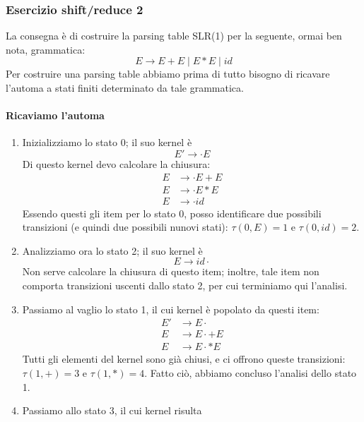 \documentclass[class=book, crop=false, oneside, 12pt]{standalone}
\begin{document}
\subsubsection{Esercizio shift/reduce 2}
La consegna è di costruire la parsing table SLR(1) per la seguente, ormai ben nota, grammatica:
\begin{equation}
    \label{eq:ex2-sh/re-grammar}
    E \to E+E \mid E*E \mid id
\end{equation} 
Per costruire una parsing table abbiamo prima di tutto bisogno di ricavare l'automa a stati finiti determinato da tale grammatica.
\paragraph{Ricaviamo l'automa}
\begin{enumerate}
    \item Inizializziamo lo stato 0; il suo kernel è 
    \begin{equation*}
        E' \to \cdot E
    \end{equation*}
    Di questo kernel devo calcolare la chiusura:
    \begin{align*}
        E &\to \cdot E+E \\
        E &\to \cdot E*E \\
        E &\to \cdot id
    \end{align*}
    Essendo questi gli item per lo stato 0, posso identificare due possibili transizioni (e quindi due possibili nunovi stati): \(\tau(0,E)=1 \textrm{ e } \tau(0,id)=2\).
    \item Analizziamo ora lo stato 2; il suo kernel è 
    \begin{equation*}
        E \to id \cdot    
    \end{equation*}
    Non serve calcolare la chiusura di questo item; inoltre, tale item non comporta transizioni uscenti dallo stato 2, per cui terminiamo qui l'analisi.
    \item Passiamo al vaglio lo stato 1, il cui kernel è popolato da questi item:
    \begin{align*}
        E' &\to E \cdot\\
        E  &\to E \cdot +E \\
        E  &\to E \cdot *E
    \end{align*}
    Tutti gli elementi del kernel sono già chiusi, e ci offrono queste transizioni: \(\tau(1,+)=3 \textrm{ e } \tau(1,*)=4\). Fatto ciò, abbiamo concluso l'analisi dello stato 1.
    \item Passiamo allo stato 3, il cui kernel risulta

\end{enumerate}
\end{document}
